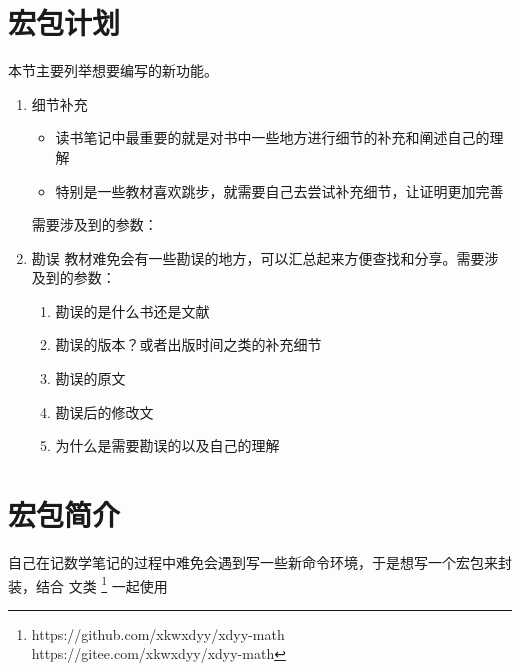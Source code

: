 \documentclass{xdyy-usermanual}
\begin{document}
\maketitle
\tableofcontents


\section{宏包计划}

本节主要列举想要编写的新功能。

\begin{enumerate}
  \item 细节补充
    \begin{itemize}
      \item 读书笔记中最重要的就是对书中一些地方进行细节的补充和阐述自己的理解
      \item 特别是一些教材喜欢跳步，就需要自己去尝试补充细节，让证明更加完善
    \end{itemize}
    需要涉及到的参数：
  \item 勘误
    教材难免会有一些勘误的地方，可以汇总起来方便查找和分享。需要涉及到的参数：
      \begin{enumerate}
        \item 勘误的是什么书还是文献
        \item 勘误的版本？或者出版时间之类的补充细节
        \item 勘误的原文
        \item 勘误后的修改文
        \item 为什么是需要勘误的以及自己的理解
      \end{enumerate}
\end{enumerate}


\section{宏包简介}

自己在记数学笔记的过程中难免会遇到写一些新命令环境，于是想写一个宏包来封装，结合  文类 \footnote{
  https://github.com/xkwxdyy/xdyy-math \\
  https://gitee.com/xkwxdyy/xdyy-math
}
一起使用
\end{document}
